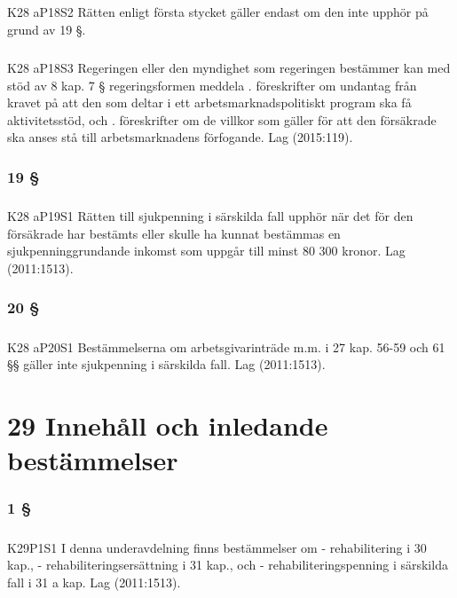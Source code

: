 \documentclass[a4paper,notitlepage,openany,10pt]{book}
\begin{document}
\paragraph*{}
{\tiny K28 aP18S2}
Rätten enligt första stycket gäller endast om den inte upphör på grund av 19 §.
\paragraph*{}
{\tiny K28 aP18S3}
Regeringen eller den myndighet som regeringen bestämmer kan med stöd av 8 kap. 7 § regeringsformen meddela
. föreskrifter om undantag från kravet på att den som deltar i ett arbetsmarknadspolitiskt program ska få aktivitetsstöd, och
. föreskrifter om de villkor som gäller för att den försäkrade ska anses stå till arbetsmarknadens förfogande.
Lag (2015:119).
\subsection*{19 §}
\paragraph*{}
{\tiny K28 aP19S1}
Rätten till sjukpenning i särskilda fall upphör när det för den försäkrade har bestämts eller skulle ha kunnat bestämmas en sjukpenninggrundande inkomst som uppgår till minst 80 300 kronor.
Lag (2011:1513).
\subsection*{20 §}
\paragraph*{}
{\tiny K28 aP20S1}
Bestämmelserna om arbetsgivarinträde m.m. i 27 kap. 56-59 och 61 §§ gäller inte sjukpenning i särskilda fall.
Lag (2011:1513).
\chapter*{29 Innehåll och inledande bestämmelser}
\subsection*{1 §}
\paragraph*{}
{\tiny K29P1S1}
I denna underavdelning finns bestämmelser om
\newline - rehabilitering i 30 kap.,
\newline - rehabiliteringsersättning i 31 kap., och
\newline - rehabiliteringspenning i särskilda fall i 31 a kap.
Lag (2011:1513).
\end{document}
